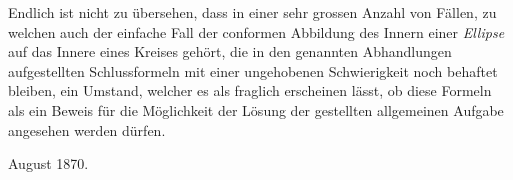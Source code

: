 \documentclass{article}
\begin{document}
Endlich ist nicht zu übersehen, dass in einer sehr grossen Anzahl von Fällen, zu welchen auch der einfache Fall der conformen Abbildung des Innern einer \emph{Ellipse} auf das Innere eines Kreises gehört, die in den genannten Abhandlungen aufgestellten Schlussformeln mit einer ungehobenen Schwierigkeit noch behaftet bleiben, ein Umstand, welcher es als fraglich erscheinen lässt, ob diese Formeln als ein Beweis für die Möglichkeit der Lösung der gestellten allgemeinen Aufgabe angesehen werden dürfen.

August 1870.
\end{document}
